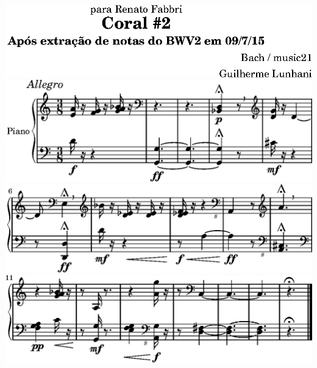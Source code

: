\includegraphics{../examples/bwv2/87/lily-e2caa734-1}%
\ifx\betweenLilyPondSystem \undefined
  \linebreak
\else
  \expandafter{}%
\fi
\includegraphics{../examples/bwv2/87/lily-e2caa734-2}%
\ifx\betweenLilyPondSystem \undefined
  \linebreak
\else
  \expandafter{}%
\fi
\includegraphics{../examples/bwv2/87/lily-e2caa734-3}%
\ifx\betweenLilyPondSystem \undefined
  \linebreak
\else
  \expandafter{}%
\fi
\includegraphics{../examples/bwv2/87/lily-e2caa734-4}%
